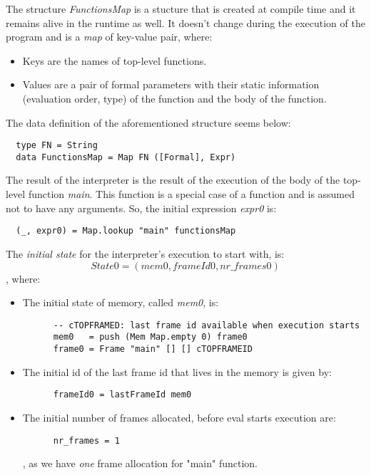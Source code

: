 \documentclass[diploma]{softlab-thesis}
\begin{document}
The structure \textit{FunctionsMap} is a stucture that is created at compile time and it remains alive in the runtime 
as well. It doesn't change during the execution of the program and is a \textit{map} of key-value pair, where:
\begin{itemize} 
  \item Keys are the names of top-level functions.
  \item Values are a pair of formal parameters with their static information (evaluation order, type) 
  of the function and the body of the function.
\end{itemize}
The data definition of the aforementioned structure seems below:
\begin{verbatim}
  type FN = String 
  data FunctionsMap = Map FN ([Formal], Expr)
\end{verbatim}

The result of the interpreter is the result of the execution of the body of the top-level function \textit{main}. 
This function is a special case of a function and is assumed not to have any arguments. So, the initial expression 
\textit{expr0} is: 
\begin{verbatim}
  (_, expr0) = Map.lookup "main" functionsMap
\end{verbatim}

The \textit{initial state} for the interpreter's execution to start with, is:
\[ State0 = (mem0, frameId0, nr\_frames0) \], where:
\begin{itemize}
  \item The initial state of memory, called \textit{mem0}, is:
    \begin{verbatim}
      -- cTOPFRAMED: last frame id available when execution starts
      mem0   = push (Mem Map.empty 0) frame0 
      frame0 = Frame "main" [] [] cTOPFRAMEID 
    \end{verbatim}
  \item The initial id of the last frame id that lives in the memory is given by:
    \begin{verbatim}
      frameId0 = lastFrameId mem0
    \end{verbatim}
  \item The initial number of frames allocated, before eval starts execution are:
    \begin{verbatim}
      nr_frames = 1
    \end{verbatim}
  , as we have \textit{one} frame allocation for "main" function.
\end{itemize}
\end{document}
